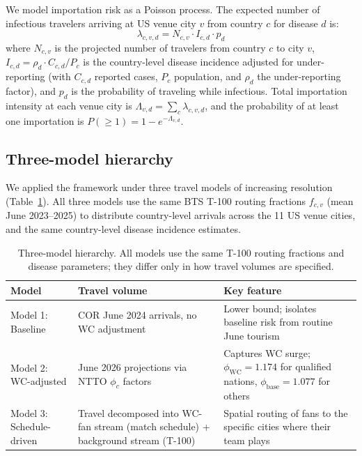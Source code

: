 \documentclass[12pt]{article}
\begin{document}
We model importation risk as a Poisson process. The expected number
of infectious travelers arriving at US venue city $v$ from country
$c$ for disease $d$ is:
\begin{equation}
  \lambda_{c,v,d} = N_{c,v} \cdot I_{c,d} \cdot p_d
  \label{eq:lambda}
\end{equation}
where $N_{c,v}$ is the projected number of travelers from country $c$
to city $v$, $I_{c,d} = \rho_d \cdot C_{c,d}/P_c$ is the
country-level disease incidence adjusted for under-reporting (with
$C_{c,d}$ reported cases, $P_c$ population, and $\rho_d$ the
under-reporting factor), and $p_d$ is the probability of traveling
while infectious. Total importation intensity at each venue city is
$\Lambda_{v,d} = \sum_c \lambda_{c,v,d}$, and the probability of at
least one importation is $P(\geq 1) = 1 - e^{-\Lambda_{v,d}}$.

\subsection*{Three-model hierarchy}

We applied the framework under three travel models of increasing
resolution (Table~\ref{tab:models}). All three models use the same
BTS T-100 routing fractions $f_{c,v}$ (mean June 2023--2025) to
distribute country-level arrivals across the 11 US venue cities, and
the same country-level disease incidence estimates.

\begin{table}[h!]
\centering
\small
\begin{tabular}{p{2.8cm} p{4.2cm} p{6cm}}
\toprule
\textbf{Model} & \textbf{Travel volume} & \textbf{Key feature} \\
\midrule
Model 1: Baseline &
  COR June 2024 arrivals, no WC adjustment &
  Lower bound; isolates baseline risk from routine June tourism \\[4pt]
Model 2: WC-adjusted &
  June 2026 projections via NTTO $\phi_c$ factors &
  Captures WC surge; $\phi_\text{WC}=1.174$ for qualified nations,
  $\phi_\text{base}=1.077$ for others \\[4pt]
Model 3: Schedule-driven &
  Travel decomposed into WC-fan stream (match schedule) +
  background stream (T-100) &
  Spatial routing of fans to the specific cities where their team plays \\
\bottomrule
\end{tabular}
\caption{Three-model hierarchy. All models use the same T-100 routing
fractions and disease parameters; they differ only in how travel
volumes are specified.}
\label{tab:models}
\end{table}
\end{document}
